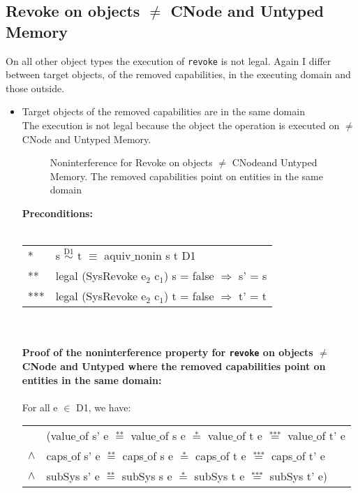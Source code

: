 \subsection{Revoke on objects $\neq$ CNode and Untyped Memory} 
On all other object types the execution of \texttt{revoke} is not legal. Again I differ between target objects, of the removed capabilities, in the executing domain and those outside.
\begin{itemize}
\item Target objects of the removed capabilities are in the same domain \\
The execution is not legal because the object the operation is executed on $\neq$ CNode and Untyped Memory.
\begin{figure}[H]
\caption{Noninterference for Revoke on objects $\neq$ CNodeand Untyped Memory. The removed capabilities point on entities in the same domain}
\label{fig:RevokeOthers}
\end{figure}
\textbf{Preconditions:} \\ \\
\begin{tabular}{ll}
* & s $\overset{\text{D1}}{\sim}$ t $\equiv$ aquiv$\_$nonin s t D1	\\ 
** & legal (SysRevoke e$_2$ c$_1$) s = false $\Rightarrow$ s' = s \\ 
*** & legal (SysRevoke e$_2$ c$_1$) t = false $\Rightarrow$ t' = t
\end{tabular} \\ \\ 
\textbf{Proof of the noninterference property for \texttt{revoke} on objects $\neq$ CNode and Untyped where the removed capabilities point on entities in the same domain:}\\ \\
For all e $\in$ D1, we have: \\ 
\begin{tabular}{ll}
& (value$\_$of s' e $\overset{\text{**}}{=}$ value$\_$of s e $\overset{\text{*}}{=}$ value$\_$of t e $\overset{\text{***}}{=}$ value$\_$of t' e \\
$\wedge$ & caps$\_$of s' e $\overset{\text{**}}{=}$ caps$\_$of s e $\overset{\text{*}}{=}$ caps$\_$of t e $\overset{\text{***}}{=}$ caps$\_$of t' e \\
$\wedge$ & subSys s' e $\overset{\text{**}}{=}$ subSys s e $\overset{\text{*}}{=}$ subSys t e $\overset{\text{***}}{=}$ subSys t' e)
\end{tabular} \\

\end{itemize}
